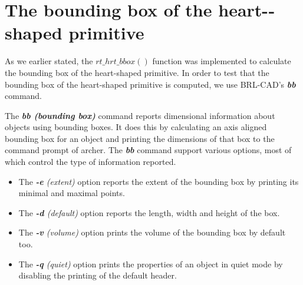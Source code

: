 \clearpage



\section{The bounding box of the heart-­shaped primitive}

As   we   earlier   stated,   the   $rt\_hrt\_bbox()$   function   was   implemented   to
 calculate   the   bounding   box   of   the   heart-­shaped   primitive.   In   order   to   test   that  
the   bounding   box   of   the   heart-­shaped   primitive   is   computed,   we   use  
BRL­-CAD's \textit{\textbf{bb}} \cite{39} command.

\hspace{30} The   \textit{\textbf{bb (bounding box)}}  command   reports   dimensional   information   about   objects   using  
bounding   boxes.   It   does   this   by   calculating   an   axis­ aligned   bounding   box   for   an  
object   and   printing   the   dimensions   of   that   box   to   the   command   prompt   of  
archer.   The   \textit{\textbf{bb}}   command   support   various   options,   most   of   which   control   the  
type of information reported.  

\begin{itemize}
\item The \textit{\textbf{-­e} (extent)} option reports the extent of the bounding box by printing its minimal and maximal points.  
\item The \textit{\textbf{-­d} (default)} option reports the length, width and height of the box.  
\item The \textit{\textbf{-­v} (volume)} option prints the volume of the bounding box by default too.  
\item The \textit{\textbf{-­q} (quiet)} option prints the properties of an object in quiet mode by disabling the printing of the default header.
\end{itemize}

